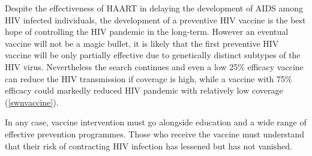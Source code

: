 Despite the effectiveness of HAART in delaying the development of AIDS among HIV infected
individuals, the development of a preventive HIV vaccine is the best hope of controlling
the HIV pandemic in the long-term. However an eventual vaccine will not be a magic
bullet, it is likely that the first preventive HIV vaccine will be only partially
effective due to genetically distinct subtypes of the HIV virus. Nevertheless the search
continues and even a low 25\% efficacy vaccine can reduce the HIV transmission if
coverage is high, while a vaccine with 75\% efficacy could markedly reduced HIV pandemic
with relatively low coverage (\ref{swnvaccine}).

\newpage
In any case, vaccine intervention must go alongside education and a wide range of
effective prevention programmes. Those who receive the vaccine must understand that their
risk of contracting HIV infection has lessened but has not vanished.


